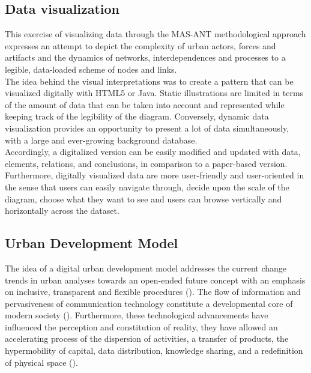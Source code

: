\documentclass[11pt]{report}
\begin{document}
{{{\subsection{Data visualization}

This exercise of visualizing data through the MAS-ANT methodological approach expresses an attempt to depict the complexity of urban actors, forces and artifacts and the dynamics of networks, interdependences and processes to a legible, data-loaded scheme of nodes and links. 
\\

The idea behind the visual interpretations was to create a pattern that can be visualized digitally with HTML5 or Java. Static illustrations are limited in terms of the amount of data that can be taken into account and represented while keeping track of the legibility of the diagram. Conversely, dynamic data visualization provides an opportunity to present a lot of data simultaneously, with a large and ever-growing background database. 
\\

Accordingly, a digitalized version can be easily modified and updated with data, elements, relations, and conclusions, in comparison to a paper-based version. Furthermore, digitally visualized data are more user-friendly and user-oriented in the sense that users can easily navigate through, decide upon the scale of the diagram, choose what they want to see and users can browse vertically and horizontally across the dataset.

\subsection{Urban Development Model}

The idea of a digital urban development model addresses the current change trends in urban analyses towards an open-ended future concept with an emphasis on inclusive, transparent and flexible procedures (\href{Rode}{\citealt{rode_city_2006}}).
The flow of information and pervasiveness of communication technology constitute a developmental core of modern society (\href{ref}{\citealt{sassen_cities_2012}}).
Furthermore, these technological advancements have influenced the perception and constitution of reality, they have allowed an accelerating process of the dispersion of activities, a transfer of products, the hypermobility of capital, data distribution, knowledge sharing, and a redefinition of physical space  (\href{ref}{\citealt{firmino_pervasive_2008}}). 
\\

}}}
\end{document}
